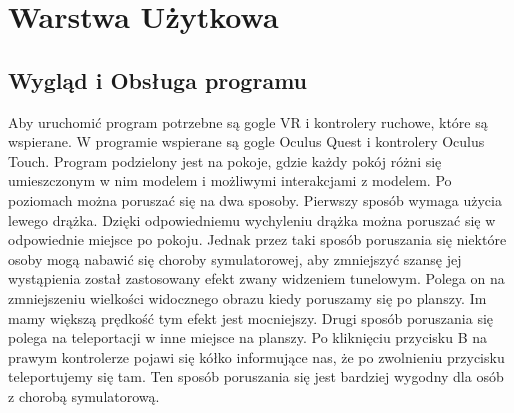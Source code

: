 \documentclass[a4paper,12pt,reqno]{article}
\begin{document}
\newpage
\section{Warstwa Użytkowa}

\subsection{Wygląd i Obsługa programu}

Aby uruchomić program potrzebne są gogle VR i kontrolery ruchowe, które są wspierane. W programie wspierane są gogle Oculus Quest i kontrolery Oculus Touch. Program podzielony jest na pokoje, gdzie każdy pokój różni się umieszczonym w nim modelem i możliwymi interakcjami z modelem. Po poziomach można poruszać się na dwa sposoby. Pierwszy sposób wymaga użycia lewego drążka. Dzięki odpowiedniemu wychyleniu drążka można poruszać się w odpowiednie miejsce po pokoju. Jednak przez taki sposób poruszania się niektóre osoby mogą nabawić się choroby symulatorowej\cite{choroba_vr}, aby zmniejszyć szansę jej wystąpienia został zastosowany efekt zwany widzeniem tunelowym. Polega on na zmniejszeniu wielkości widocznego obrazu kiedy poruszamy się po planszy. Im mamy większą prędkość tym efekt jest mocniejszy. Drugi sposób poruszania się polega na teleportacji w inne miejsce na planszy. Po kliknięciu przycisku B na prawym kontrolerze pojawi się kółko informujące nas, że po zwolnieniu przycisku teleportujemy się tam. Ten sposób poruszania się jest bardziej wygodny dla osób z chorobą symulatorową.
\end{document}
